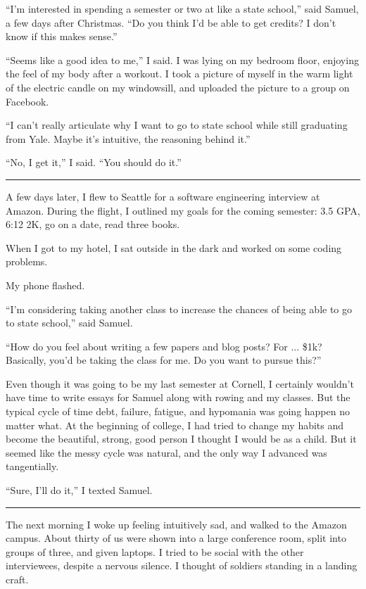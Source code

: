 ``I'm interested in spending a semester or two at like a state school,'' said
Samuel, a few days after Christmas.  ``Do you think I'd be able to get credits?
I don't know if this makes sense.''

``Seems like a good idea to me,'' I said.  I was lying on my bedroom floor,
enjoying the feel of my body after a workout.   I took a picture of myself in
the warm light of the electric candle on my windowsill, and uploaded the picture
to a group on Facebook. 

``I can't really articulate why I want to go to state school while still
graduating from Yale.   Maybe it's intuitive, the reasoning behind it.'' 

``No, I get it,'' I said. ``You should do it.''

\plainfancybreak{12pt}{2}{* * *}

A few days later, I flew to Seattle for a software engineering interview at
Amazon.  During the flight, I outlined my goals for the coming semester: 3.5 GPA,
6:12 2K, go on a date, read three books.  

When I got to my hotel, I sat outside in the dark and worked on some coding
problems. 

My phone flashed.

``I'm considering taking another class to increase the chances of being able to
go to state school,'' said Samuel.  

``How do you feel about writing a few papers and blog posts?  For ... \$1k?
Basically, you'd be taking the class for me.  Do you want to pursue this?'' 

Even though it was going to be my last semester at Cornell, I certainly wouldn't
have time to write essays for Samuel along with rowing and my classes.  But the
typical cycle of time debt, failure, fatigue, and hypomania was going happen no
matter what.  At the beginning of college, I had tried to change my habits and
become the beautiful, strong, good person I thought I would be as a child.  But
it seemed like the messy cycle was natural, and the only way I advanced was
tangentially.

``Sure, I'll do it,'' I texted Samuel.

\plainfancybreak{12pt}{2}{* * *}

The next morning I woke up feeling intuitively sad, and walked to the Amazon
campus.  About thirty of us were shown into a large conference room, split into
groups of three, and given laptops.  I tried to be social with the other
interviewees, despite a nervous silence. I thought of soldiers standing in a
landing craft. 

